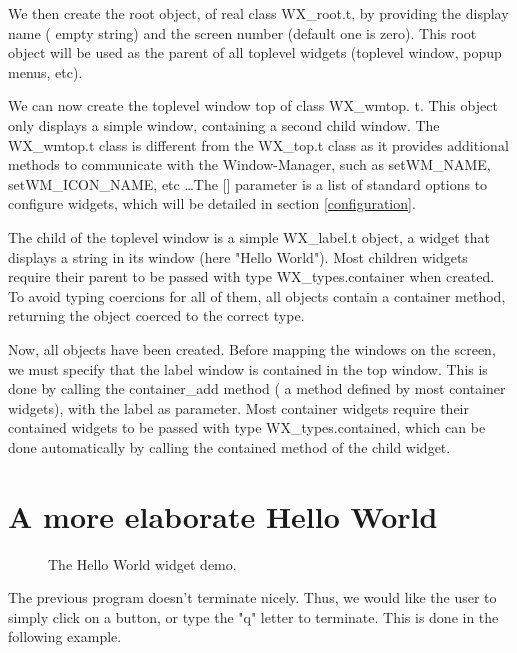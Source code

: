 \documentclass{report}
\newcommand{\psfigure}[3]{ %
  \begin{quote}\let\normalsize\small\caption{#3\label{fig:#2}}\end{quote}
  }
\begin{document}
 We then create the {\sf root} object, of real class {\sf WX\_root.t}, by
providing the display name ( empty string) and the screen number (default one
is zero). This root object will be used as the parent of all toplevel 
widgets (toplevel window, popup menus, etc).

 We can now create the toplevel window {\sf top} of class {\sf WX\_wmtop. t}.
This object only displays a simple window, containing a second child window.
The {\sf WX\_wmtop.t} class is different from the {\sf WX\_top.t} class as it
provides additional methods to communicate with the Window-Manager, such as
{\sf setWM\_NAME}, {\sf setWM\_ICON\_NAME}, etc \ldots The [] parameter is a 
list of standard options to configure widgets, which will be detailed in 
section \ref{configuration}.

 The child of the toplevel window is a simple {\sf WX\_label.t} object, a 
widget that displays a string in its window (here "Hello World"). Most 
children widgets require their parent to be passed with type {\sf 
WX\_types.container} when created. To avoid typing coercions for all of 
them, all objects contain a {\sf container} method, returning the object 
coerced to the correct type.

 Now, all objects have been created. Before mapping the windows on the
screen, we must specify that the {\sf label} window is contained in the { \sf
top} window. This is done by calling the {\sf container\_add} method ( a
method defined by most container widgets), with the label as parameter. Most
container widgets require their contained widgets to be passed with type {\sf
WX\_types.contained}, which can be done automatically by calling the { \sf
contained} method of the child widget.

\section{A more elaborate Hello World}

\begin{figure}[t]
\begin{center}
\psfigure{0.3}{hello}{The Hello World widget demo.}
\end{center}
\end{figure}
 
 
The previous program doesn't terminate nicely. Thus, we would like the 
user to simply click on a button, or type the "q" letter to terminate.
This is done in the following example.
\end{document}
